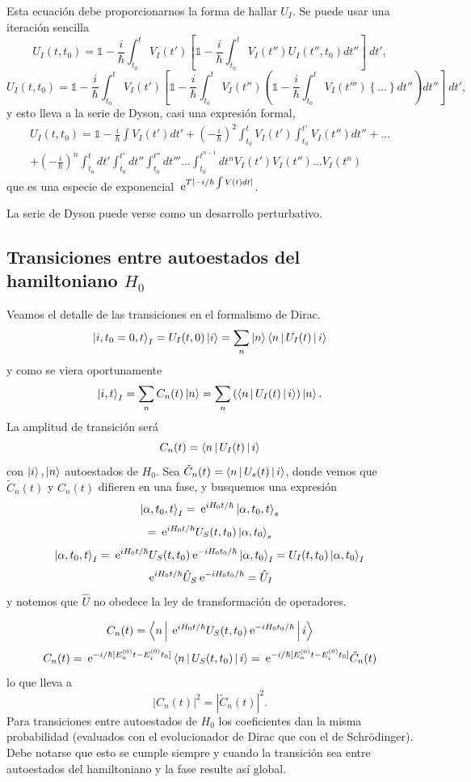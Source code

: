 \documentclass[10pt,oneside]{CBFT_book}
\begin{document}
Esta ecuación debe proporcionarnos la forma de hallar $U_I$. Se puede usar una iteración sencilla
\[
	U_I(t,t_0) = \mathbb{1} - \frac{i}{\hbar} \int_{t_0}^t \: V_I(t') \left[ 
	\mathbb{1} - \frac{i}{\hbar} \int_{t_0}^t \: V_I(t'') U_I(t'',t_0) dt''
	\right] \: dt',
\]
\[
	U_I(t,t_0) = \mathbb{1} - \frac{i}{\hbar} \int_{t_0}^t \: V_I(t') \left[ 
	\mathbb{1} - \frac{i}{\hbar} \int_{t_0}^t \: V_I(t'') \left(
	\mathbb{1} - \frac{i}{\hbar} \int_{t_0}^t \: V_I(t''') \left\{ ... \right\} dt''
	\right) dt''
	\right] \: dt',
\]
y esto lleva a la serie de Dyson, casi una expresión formal,
\begin{multline*}
	U_I(t,t_0) = \mathbb{1} - \frac{i}{\hbar}\int V_I(t') dt' + \left( -\frac{i}{\hbar} \right)^2\int_{t_0}^t 
	V_I(t') \int_{t_0}^{t'}V_I(t'')dt'' + ...\\ + \left( -\frac{i}{\hbar} \right)^n 
	\int_{t_0}^t dt'\int_{t_0}^{t'}dt''\int_{t_0}^{t''}dt''' ... \int_{t_0}^{t^{n-1}}dt^{n} V_I(t') 
	V_I(t'')...V_I(t^n)	
\end{multline*}
que es una especie de exponencial $ \:\mathrm{e}^{T[-i/\hbar \int V(t) dt ]}$.

La serie de Dyson puede verse como un desarrollo perturbativo.

\subsection{Transiciones entre autoestados del hamiltoniano $H_0$}

Veamos el detalle de las transiciones en el formalismo de Dirac.
\[
	\Ket{i,t_0=0,t}_I = U_I(t,0) \Ket{i} = \sum_n \Ket{n}\Braket{n|U_I(t)|i}
\]
y como se viera oportunamente
\[
	\Ket{i,t}_I = \sum_n C_n(t)\Ket{n} = \sum_n \left( \Braket{n|U_I(t)|i} \right) \Ket{n}.
\]
La amplitud de transición será 
\[
	C_n(t) = \Braket{n|U_I(t)|i}
\]
con $\Ket{i},\Ket{n}$ autoestados de $H_0$.
Sea $\tilde{C}_n(t)=\Braket{n|U_s(t)|i}$, donde vemos que $\tilde{C}_n(t)$ y $C_n(t)$ difieren en
una fase, y busquemos una expresión 
\[
	\Ket{\alpha, t_0, t}_I = \:\mathrm{e}^{iH_0t/\hbar} \Ket{\alpha, t_0, t}_s
\]
\[ 
	= \:\mathrm{e}^{iH_0t/\hbar} U_S(t,t_0)\Ket{\alpha, t_0}_s
\]
\[
	\Ket{\alpha, t_0, t}_I  = \:\mathrm{e}^{iH_0t/\hbar} U_S(t,t_0) \:\mathrm{e}^{-iH_0t_0/\hbar}  \Ket{\alpha, t_0}_I
	= U_I(t,t_0) \Ket{\alpha,t_0}_I
\]
\[
	\:\mathrm{e}^{iH_0t/\hbar} \hat{U}_S \:\mathrm{e}^{-iH_0t_0/\hbar} = \hat{U}_I
\]
y notemos que $\hat{U}$ no obedece la ley de transformación de operadores.

\[
	C_n(t) = \Braket{n|\:\mathrm{e}^{iH_0t/\hbar} U_S(t,t_0) \:\mathrm{e}^{-iH_0t_0/\hbar}|i}
\]
\[
	C_n(t) = \:\mathrm{e}^{-i/\hbar[E_n^{(0)} t - E_i^{(0)} t_0]} \Braket{n| U_S(t,t_0) |i} =
		\:\mathrm{e}^{-i/\hbar[E_n^{(0)} t - E_i^{(0)} t_0]} \tilde{C}_n(t)
\]
lo que lleva a 
\[
	|C_n(t)|^2 = |\tilde{C}_n(t)|^2.
\]
Para transiciones entre autoestados de $H_0$ los coeficientes dan la misma probabilidad 
(evaluados con el evolucionador de Dirac que con el de Schrödinger).
Debe notarse que esto se cumple siempre y cuando la transición sea entre autoestados del
hamiltoniano y la fase resulte así global.
\end{document}
